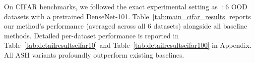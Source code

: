 \documentclass{article}
\newcommand{\tabref}[1]{Table~\ref{tab:#1}}
\begin{document}
On CIFAR benchmarks, we followed the exact experimental setting as~\citet{sun2022dice}: 6 OOD datasets with a pretrained DenseNet-101. \tabref{main_cifar_results} reports our method's performance (averaged across all 6 datasets) alongside all baseline methods. Detailed per-dataset performance is reported in \tabref{detailresultscifar10} and \tabref{detailresultscifar100} in Appendix. All ASH variants profoundly outperform existing baselines.



\begin{table}[hbt!]
\end{table}
\end{document}
